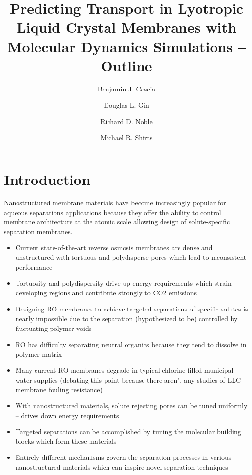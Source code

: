 \documentclass{article}
\title{Predicting Transport in Lyotropic Liquid Crystal Membranes with Molecular Dynamics Simulations -- Outline}
\author{Benjamin J. Coscia \and Douglas L. Gin \and Richard D. Noble \and Michael R. Shirts}
\begin{document}
	
	\graphicspath{{./figures/}}
	\maketitle
	\section{Introduction}
	Nanostructured membrane materials have become increasingly popular for aqueous separations applications because they offer the ability to control membrane architecture at the atomic scale allowing design of solute-specific separation membranes.
	\begin{itemize}
		\item Current state-of-the-art reverse osmosis membranes are dense and unstructured with tortuous and polydisperse pores which lead to inconsistent performance
		\item Tortuosity and polydispersity drive up energy requirements which strain developing regions and contribute strongly to CO2 emissions
		\item Designing RO membranes to achieve targeted separations of specific solutes is nearly impossible due to the separation (hypothesized to be) controlled by fluctuating polymer voids
		\item RO has difficulty separating neutral organics because they tend to dissolve in polymer matrix
		\item Many current RO membranes degrade in typical chlorine filled municipal water supplies (debating this point because there aren't any studies of LLC membrane fouling resistance)
		\item With nanostructured materials, solute rejecting pores can be tuned uniformly -- drives down energy requirements
		\item Targeted separations can be accomplished by tuning the molecular building blocks which form these materials
		\item Entirely different mechanisms govern the separation processes in various nanostructured materials which can inspire novel separation techniques
	\end{itemize}
	
\end{document}
